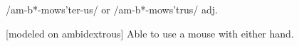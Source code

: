  /am-b*-mows'ter-us/ or /am-b*-mows'trus/ adj.

[modeled on ambidextrous] Able to use a mouse with either hand.

